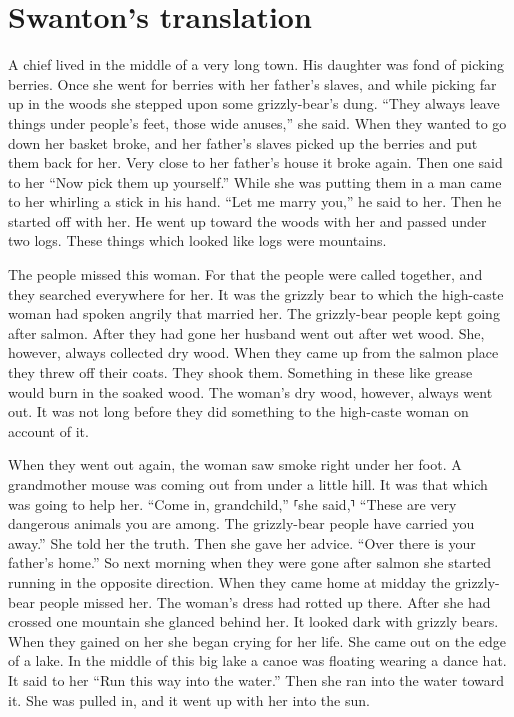 \section{Swanton’s translation}\label{sec:89-swanton-translation}

A chief lived in the middle of a very long town.
His daughter was fond of picking berries.
Once she went for berries with her father’s slaves,
and while picking far up in the woods she stepped upon some grizzly-bear’s dung.
\qqk{}“They always leave things under people’s feet, those wide anuses,”
she said.
When they wanted to go down her basket broke,
and her father’s slaves picked up the berries and put them back for her.
Very close to her father’s house it broke again.
Then one said to her
\qqk{}“Now pick them up yourself.”
While she was putting them in
a man came to her
whirling a stick in his hand.
\qqk{}“Let me marry you,” he said to her.
Then he started off with her.
He went up toward the woods with her and passed under two logs.
These things which looked like logs were mountains.

The people missed this woman.
For that the people were called together, and they searched everywhere for her.
It was the grizzly bear to which the high-caste woman had spoken angrily that married her.
The grizzly-bear people kept going after salmon.
After they had gone her husband went out after wet wood.
She, however, always collected dry wood.
When they came up from the salmon place they threw off their coats.
They shook them.
Something in these like grease would burn in the soaked wood.
The woman’s dry wood, however, always went out.
It was not long before they did something to the high-caste woman on account of it.

When they went out again,
the woman saw smoke right under her foot.
A grandmother mouse was coming out from under a little hill.
It was that which was going to help her.
\qqk{}“Come in, grandchild,” ⸢she said,⸣
\qqk{}“These are very dangerous animals you are among.
The grizzly-bear people have carried you away.”
She told her the truth.
Then she gave her advice. “Over there is your father’s home.”
So next morning when they were gone after salmon
she started running in the opposite direction.
When they came home at midday the grizzly-bear people missed her.
The woman’s dress had rotted up there.
After she had crossed one mountain she glanced behind her.
It looked dark with grizzly bears.
When they gained on her she began crying for her life.
She came out on the edge of a lake.
In the middle of this big lake a canoe was floating wearing a dance hat.
It said to her “Run this way into the water.”
Then she ran into the water toward it.
She was pulled in,
and it went up with her into the sun.


